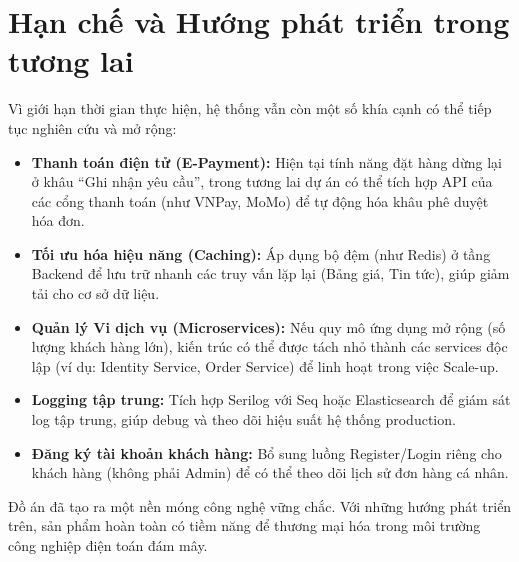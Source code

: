 \section{Hạn chế và Hướng phát triển trong tương lai}
Vì giới hạn thời gian thực hiện, hệ thống vẫn còn một số khía cạnh có thể tiếp tục nghiên cứu và mở rộng:
\begin{itemize}
    \item \textbf{Thanh toán điện tử (E-Payment):} Hiện tại tính năng đặt hàng dừng lại ở khâu ``Ghi nhận yêu cầu'', trong tương lai dự án có thể tích hợp API của các cổng thanh toán (như VNPay, MoMo) để tự động hóa khâu phê duyệt hóa đơn.
    \item \textbf{Tối ưu hóa hiệu năng (Caching):} Áp dụng bộ đệm (như Redis) ở tầng Backend để lưu trữ nhanh các truy vấn lặp lại (Bảng giá, Tin tức), giúp giảm tải cho cơ sở dữ liệu.
    \item \textbf{Quản lý Vi dịch vụ (Microservices):} Nếu quy mô ứng dụng mở rộng (số lượng khách hàng lớn), kiến trúc có thể được tách nhỏ thành các services độc lập (ví dụ: Identity Service, Order Service) để linh hoạt trong việc Scale-up.
    \item \textbf{Logging tập trung:} Tích hợp Serilog với Seq hoặc Elasticsearch để giám sát log tập trung, giúp debug và theo dõi hiệu suất hệ thống production.
    \item \textbf{Đăng ký tài khoản khách hàng:} Bổ sung luồng Register/Login riêng cho khách hàng (không phải Admin) để có thể theo dõi lịch sử đơn hàng cá nhân.
\end{itemize}

Đồ án đã tạo ra một nền móng công nghệ vững chắc. Với những hướng phát triển trên, sản phẩm hoàn toàn có tiềm năng để thương mại hóa trong môi trường công nghiệp điện toán đám mây.
